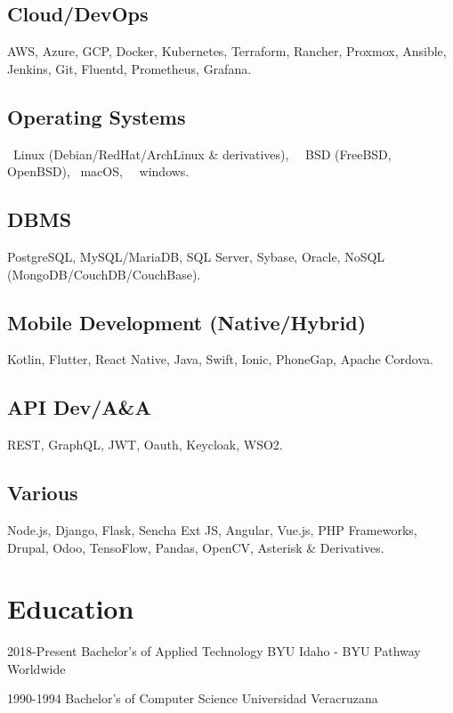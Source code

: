 \documentclass[]{friggeri-cv}
\begin{document}
\begin{multicols}{2}
    \subsection{Cloud/DevOps}
    AWS, Azure, GCP, Docker, Kubernetes, Terraform, Rancher, Proxmox, Ansible, Jenkins, Git, Fluentd, Prometheus, Grafana.
 
    \subsection{Operating Systems}
    {\faLinux}~Linux (Debian/RedHat/ArchLinux \& derivatives), {\nfBsd}~~BSD (FreeBSD, OpenBSD), {\faApple}~macOS, {\nfWindows}~~windows.

    \subsection{DBMS}
    PostgreSQL, MySQL/MariaDB, SQL Server, Sybase, Oracle, NoSQL (MongoDB/CouchDB/CouchBase).
    
    \subsection{Mobile Development (Native/Hybrid)}
    Kotlin, Flutter, React Native, Java, Swift, Ionic, PhoneGap, Apache Cordova.

    \subsection{API Dev/A\&A}
    REST, GraphQL, JWT, Oauth, Keycloak, WSO2.

    \subsection{Various}
    Node.js, Django, Flask, Sencha Ext JS, Angular, Vue.js, PHP Frameworks, Drupal, Odoo, TensoFlow, Pandas, OpenCV, Asterisk \& Derivatives.

\end{multicols}

\section{Education}

\begin{entrylist}
    \entryedu%
    {2018-Present}
    {Bachelor's of Applied Technology}
    {BYU Idaho - BYU Pathway Worldwide}
\end{entrylist}

\begin{entrylist}
    \entryedu%
    {1990-1994}
    {Bachelor's of Computer Science}
    {Universidad Veracruzana}
\end{entrylist}
\end{document}
